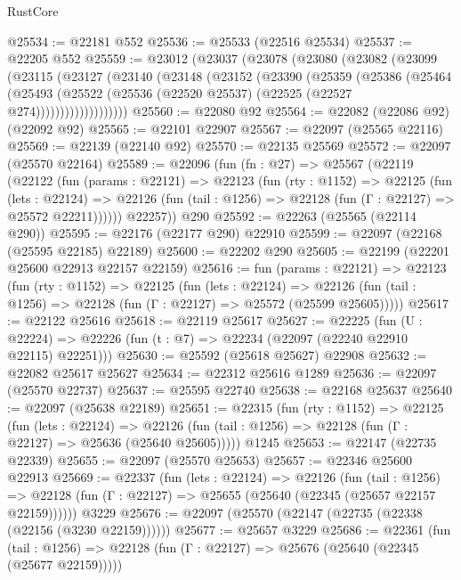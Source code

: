 \begin{lexlean}{RustCore}
\begin{coremodule}
@25534 := @22181 @552
@25536 := @25533 (@22516 @25534)
@25537 := @22205 @552
@25559 := @23012
    (@23037
      (@23078
        (@23080
          (@23082
            (@23099
              (@23115
                (@23127
                  (@23140
                    (@23148
                      (@23152
                        (@23390
                          (@25359
                            (@25386
                              (@25464
                                (@25493
                                  (@25522
                                    (@25536 (@22520 @25537) (@22525 (@22527 @274)))))))))))))))))))
@25560 := @22080 @92
@25564 := @22082 (@22086 @92) (@22092 @92)
@25565 := @22101 @22907
@25567 := @22097 (@25565 @22116)
@25569 := @22139 (@22140 @92)
@25570 := @22135 @25569
@25572 := @22097 (@25570 @22164)
@25589 := @22096
    (fun (fn : @27) =>
    @25567
      (@22119
        (@22122
          (fun (params : @22121) =>
          @22123
            (fun (rty : @1152) =>
            @22125
              (fun (lets : @22124) =>
              @22126 (fun (tail : @1256) => @22128 (fun (Γ : @22127) => @25572 @22211))))))
        @22257))
    @290
@25592 := @22263 (@25565 (@22114 @290))
@25595 := @22176 (@22177 @290) @22910
@25599 := @22097 (@22168 (@25595 @22185) @22189)
@25600 := @22202 @290
@25605 := @22199 (@22201 @25600 @22913 @22157 @22159)
@25616 := fun (params : @22121) =>
  @22123
    (fun (rty : @1152) =>
    @22125
      (fun (lets : @22124) =>
      @22126 (fun (tail : @1256) => @22128 (fun (Γ : @22127) => @25572 (@25599 @25605)))))
@25617 := @22122 @25616
@25618 := @22119 @25617
@25627 := @22225
    (fun (U : @22224) => @22226 (fun (t : @7) => @22234 (@22097 (@22240 @22910 @22115) @22251)))
@25630 := @25592 (@25618 @25627) @22908
@25632 := @22082 @25617 @25627
@25634 := @22312 @25616 @1289
@25636 := @22097 (@25570 @22737)
@25637 := @25595 @22740
@25638 := @22168 @25637
@25640 := @22097 (@25638 @22189)
@25651 := @22315
    (fun (rty : @1152) =>
    @22125
      (fun (lets : @22124) =>
      @22126 (fun (tail : @1256) => @22128 (fun (Γ : @22127) => @25636 (@25640 @25605)))))
    @1245
@25653 := @22147 (@22735 @22339)
@25655 := @22097 (@25570 @25653)
@25657 := @22346 @25600 @22913
@25669 := @22337
    (fun (lets : @22124) =>
    @22126
      (fun (tail : @1256) =>
      @22128 (fun (Γ : @22127) => @25655 (@25640 (@22345 (@25657 @22157 @22159))))))
    @3229
@25676 := @22097 (@25570 (@22147 (@22735 (@22338 (@22156 (@3230 @22159))))))
@25677 := @25657 @3229
@25686 := @22361
    (fun (tail : @1256) => @22128 (fun (Γ : @22127) => @25676 (@25640 (@22345 (@25677 @22159)))))

\end{coremodule}
\end{lexlean}
